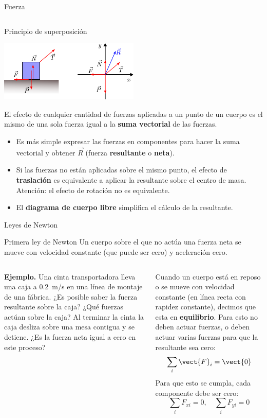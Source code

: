 \documentclass[9pt, aspectratio=169]{beamer}
\begin{document}
\begin{frame}{Fuerza}
\begin{columns}
\begin{center}
\end{center}
\end{columns}
\end{frame}

\begin{frame}{Principio de superposición}
\begin{center}
    \includegraphics[width=0.5\textwidth]{figs/fig-04.pdf}
\end{center}
\begin{definition}
El efecto de cualquier cantidad de fuerzas aplicadas a un punto  de un cuerpo es el mismo de una sola fuerza igual a la \textbf{suma vectorial} de las fuerzas.
\end{definition}
\pause

\begin{itemize}
    \item Es más simple expresar las fuerzas en componentes para hacer la suma vectorial y obtener $\vec{R}$ (fuerza \textbf{resultante} o \textbf{neta}).
    \item Si las fuerzas no están aplicadas sobre el mismo punto, el efecto de \textbf{traslación} es equivalente a aplicar la resultante sobre el centro de masa. \alert{Atención: el efecto de rotación no es equivalente}.
    \item El \textbf{diagrama de cuerpo libre} simplifica el cálculo de la resultante.
\end{itemize}
\end{frame}

\begin{frame}{Leyes de Newton}
\begin{block}{Primera ley de Newton}
Un cuerpo sobre el que no actúa una fuerza neta se mueve con velocidad constante (que puede ser cero) y aceleración cero.
\end{block}
\pause
\medskip

\begin{columns} 
\cx 
\textbf{Ejemplo.} Una cinta transportadora lleva una caja a \qty{0.2}{m/s} en una línea de montaje de una fábrica. ¿Es posible saber la fuerza resultante sobre la caja? ¿Qué fuerzas actúan sobre la caja? Al terminar la cinta la caja desliza sobre una mesa contigua y se detiene. ¿Es la fuerza neta igual a cero en este proceso?
\pause

\cx 
Cuando un cuerpo está en reposo o se mueve con velocidad constante (en línea recta con rapidez constante), decimos que esta en \textbf{equilibrio}. Para esto no deben actuar fuerzas, o deben actuar varias fuerzas para que la resultante sea cero:
\[ \sum_i \vect{F}_i = \vect{0} \]
Para que esto se cumpla, cada componente debe ser cero:
\[ \sum_i F_{xi} = 0, \quad \sum_i F_{yi} = 0 \]
\end{columns}
\end{frame}
\end{document}
